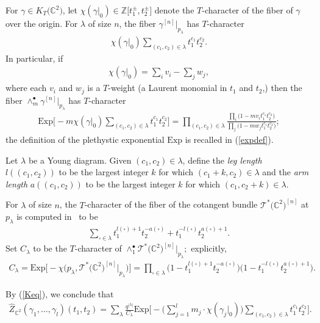 \documentclass[10pt,a4paper]{amsart}
\numberwithin{equation}{section}
\newcommand{\Exp}{\mathrm{Exp}}
\def\C{\mathbb C}
\def\Z{\mathbb Z}
\begin{document}
For $\gamma\in K_T\big(\C^2\big)$, let $\chi(\gamma|_{0})\in \Z\big[t_1^{\pm},t_2^{\pm}\big]$ denote the $T$-character of the fiber of $\gamma$ over the origin. For $\lambda$ of size $n$, the fiber $\gamma^{[n]}|_{p_{\lambda}}$ has $T$-character
\begin{gather*}
\chi(\gamma|_{0}) \sum_{(c_1,c_2)\in \lambda}t_1^{c_1}t_2^{c_2}.
\end{gather*}
In particular, if
\begin{gather*}
\chi(\gamma|_{0})=\sum_{i} v_i -\sum_{j} w_j,
\end{gather*}
where each $v_i$ and $w_j$ is a $T$-weight (a Laurent monomial in $t_1$ and $t_2$,) then the fiber $ \wedge^{\bullet}_m \gamma^{[n]}|_{p_{\lambda}}$ has $T$-character
\begin{gather*}
\Exp\biggl[{-}m\chi(\gamma|_{0}) \sum_{(c_1,c_2)\in\lambda}t_1^{c_1}t_2^{c_2}\biggr]=\prod_{(c_1,c_2)\in \lambda} \frac{\prod_{i}\big(1-mv_it_1^{c_1}t_2^{c_2}\big)}{\prod_{j}\big(1-mw_jt_1^{c_1}t_2^{c_2}\big)};
\end{gather*}
the definition of the plethystic exponential $\Exp$ is recalled in (\ref{expdef}).

Let $\lambda$ be a Young diagram. Given $(c_1,c_2)\in \lambda$, define the {\em leg length} $l((c_1,c_2))$ to be the largest integer $k$ for which $(c_1+k,c_2)\in \lambda$ and the {\em arm length} $a((c_1,c_2))$ to be the largest integer $k$ for which $(c_1,c_2+k)\in \lambda$.

For $\lambda$ of size $n$, the $T$-character of the fiber of the cotangent bundle $\mathcal{T}^{*}\big(\C^2\big)^{[n]}$ at $p_{\lambda}$ is computed in~\cite[Lemma~3.2]{ES} to be
\begin{gather*}
\sum_{\square\in\lambda} t_1^{l(\square)+1}t_2^{-a(\square)}+t_1^{-l(\square)}t_2^{a(\square)+1}.
\end{gather*}
Set $C_{\lambda}$ to be the $T$-character of ${\wedge^{\bullet}_1 \mathcal{T}^{*}\big(\C^2\big)^{[n]}|_{p_{\lambda}}};$ explicitly,
\begin{align}\label{Clambdadef} C_{\lambda}=\Exp\big[{-}\chi\big(p_{\lambda},\mathcal{T}^{*}\big(\C^2\big)^{[n]}|_{p_{\lambda}}\big)\big]= \prod_{\square\in\lambda}{\big(1- t_1^{l(\square)+1}t_2^{-a(\square)}\big) \big(1-t_1^{-l(\square)}t_2^{a(\square)+1}\big)}.
\end{align}

By (\ref{Keq}), we conclude that
\begin{align}\label{combZ}
\hat{Z}_{\C^2}(\gamma_1,\dots,\gamma_l)(t_1,t_2)=\sum_{\lambda}\frac{q^{|\lambda|}}{C_{\lambda}} \Exp\biggl[{-} \biggl(\sum_{j=1}^{l}m_j\cdot \chi(\gamma_j|_0)\biggr)\sum_{(c_1,c_2)\in \lambda} t_1^{c_1}t_2^{c_2} \biggr].
\end{align}
\end{document}

